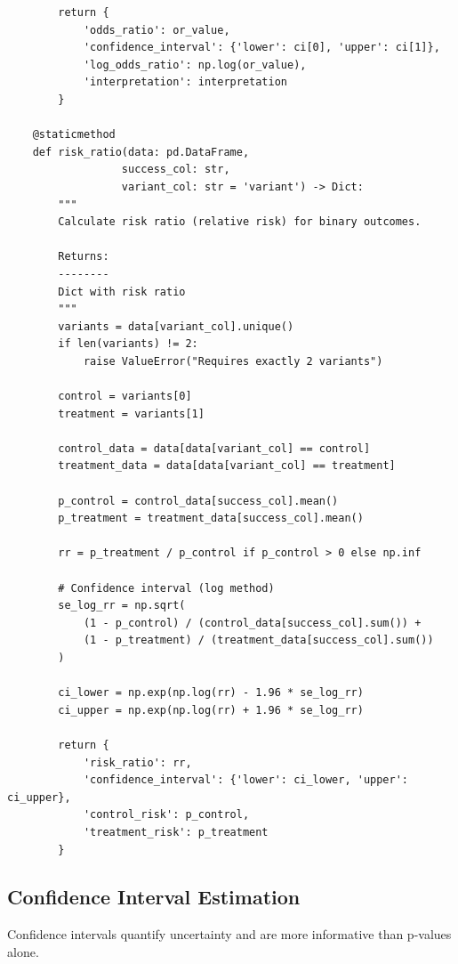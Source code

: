 \begin{lstlisting}
        return {
            'odds_ratio': or_value,
            'confidence_interval': {'lower': ci[0], 'upper': ci[1]},
            'log_odds_ratio': np.log(or_value),
            'interpretation': interpretation
        }

    @staticmethod
    def risk_ratio(data: pd.DataFrame,
                  success_col: str,
                  variant_col: str = 'variant') -> Dict:
        """
        Calculate risk ratio (relative risk) for binary outcomes.

        Returns:
        --------
        Dict with risk ratio
        """
        variants = data[variant_col].unique()
        if len(variants) != 2:
            raise ValueError("Requires exactly 2 variants")

        control = variants[0]
        treatment = variants[1]

        control_data = data[data[variant_col] == control]
        treatment_data = data[data[variant_col] == treatment]

        p_control = control_data[success_col].mean()
        p_treatment = treatment_data[success_col].mean()

        rr = p_treatment / p_control if p_control > 0 else np.inf

        # Confidence interval (log method)
        se_log_rr = np.sqrt(
            (1 - p_control) / (control_data[success_col].sum()) +
            (1 - p_treatment) / (treatment_data[success_col].sum())
        )

        ci_lower = np.exp(np.log(rr) - 1.96 * se_log_rr)
        ci_upper = np.exp(np.log(rr) + 1.96 * se_log_rr)

        return {
            'risk_ratio': rr,
            'confidence_interval': {'lower': ci_lower, 'upper': ci_upper},
            'control_risk': p_control,
            'treatment_risk': p_treatment
        }

\end{lstlisting}

\subsection{Confidence Interval Estimation}

Confidence intervals quantify uncertainty and are more informative than p-values alone.

